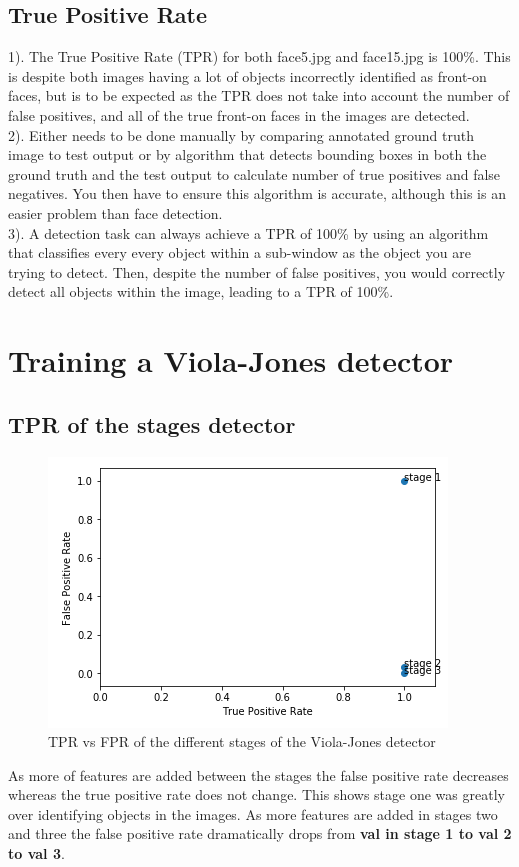 \documentclass{article}
\begin{document}
    \subsection{True Positive Rate}
      1). The True Positive Rate (TPR) for both face5.jpg and face15.jpg is 100\%. This is despite both images having a lot of objects incorrectly identified as front-on faces, but is to be expected as the TPR does not take into account the number of false positives, and all of the true front-on faces in the images are detected.\\
      2). Either needs to be done manually by comparing annotated ground truth image to test output or by algorithm that detects bounding boxes in both the ground truth and the test output to calculate number of true positives and false negatives. You then have to ensure this algorithm is accurate, although this is an easier problem than face detection.\\
      3). A detection task can always achieve a TPR of 100\% by using an algorithm that classifies every every object within a sub-window as the object you are trying to detect. Then, despite the number of false positives, you would correctly detect all objects within the image, leading to a TPR of 100\%.\\
  \section{Training a Viola-Jones detector}
    \subsection{TPR of the stages detector}
    \begin{figure}
        \centering
        \includegraphics{TPRvsFPR.png}
        \caption{TPR vs FPR of the different stages of the Viola-Jones detector}
        \label{TPRvsFPR}
    \end{figure}
    As more of features are added between the stages the false positive rate decreases whereas the true positive rate does not change. This shows stage one was greatly over identifying objects in the images. As more features are added in stages two and three the false positive rate dramatically drops from \textbf{val in stage 1 to val 2 to val 3}.
\end{document}
